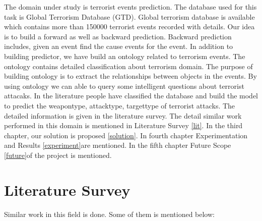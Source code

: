 \documentclass[journal,onecolumn,11pt]{IEEEtran}
\begin{document}
The domain under study is terrorist events prediction. The database used for this task is Global Terrorism Database (GTD). Global terrorism database is available which contains more than 150000 terrorist events recorded with details. Our idea is to build a forward as well as  backward prediction. Backward prediction includes, given an event find the cause events for the event. In addition to building predictor, we have build an ontology related to terrorism events. The ontology contains detailed classification about terrorism domain. The purpose of building ontology is to extract the relationships between objects in the events. By using ontology we can able to query some intelligent questions about terrorist attacaks. In the literature people have classified the database and build the model to predict the weapontype, attacktype, targettype of terrorist attacks. The detailed information is given in the literature survey. The detail similar work performed in this domain is mentioned in Literature Survey \autoref{lit}. In the third chapter, our solution is proposed \autoref{solution}. In fourth chapter Experimentation and Results \autoref{experiment}are mentioned. In the fifth chapter Future Scope \autoref{future}of the project is mentioned.


\section{Literature Survey}
\label{lit}
Similar work in this field is done. Some of them is mentioned below:
\end{document}

